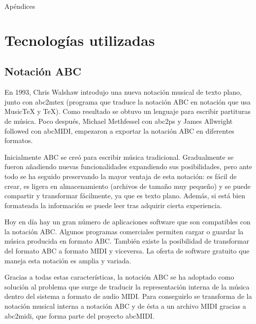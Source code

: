     \thispagestyle{plain}
	\vspace*{\fill}
    \begin{center}
      {\Huge Apéndices}\\[0.5cm]
    \end{center}
    \vspace*{\fill}


\appendix

\chapter{Tecnologías utilizadas}
\label{chap:techs}

\makeatletter
\def\cleardoublepage{\clearpage\if@twoside \ifodd\c@page\else
  \hbox{}
  \vspace*{\fill}
  \newpage
  \if@twocolumn\hbox{}\newpage\fi\fi\fi}
\makeatother

\section{Notación ABC}
\label{sec:NotacionABC}

En 1993, Chris Walshaw introdujo una nueva notación musical de texto plano, junto con abc2mtex (programa que traduce la notación ABC en notación que usa MusicTeX y TeX). Como resultado se obtuvo un lenguaje para escribir partituras de música. Poco después, Michael Methfessel con abc2ps y James Allwright followed con abcMIDI, empezaron a exportar la notación ABC en diferentes formatos.

Inicialmente ABC se creó para escribir música tradicional. Gradualmente se fueron añadiendo nuevas funcionalidades expandiendo sus posibilidades, pero ante todo se ha seguido preservando la mayor ventaja de esta notación: es fácil de crear, es ligera en almacenamiento (archivos de tamaño muy pequeño) y se puede compartir y transformar fácilmente, ya que es texto plano. Además, si está bien formateada la información se puede leer tras adquirir cierta experiencia.

Hoy en día hay un gran número de aplicaciones software que son compatibles con la notación ABC. Algunos programas comerciales permiten cargar o guardar la música producida en formato ABC. También existe la posibilidad de transformar del formato ABC a formato MIDI y viceversa. La oferta de software gratuito que maneja esta notación es amplia y variada. 

Gracias a todas estas características, la notación ABC se ha adoptado como solución al problema que surge de traducir la representación interna de la música dentro del sistema a formato de audio MIDI. Para conseguirlo se transforma de la notación musical interna a notación ABC y de ésta a un archivo MIDI gracias a abc2midi, que forma parte del proyecto abcMIDI.

